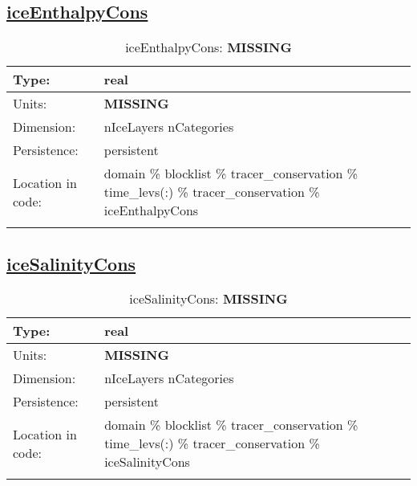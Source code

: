 \subsection[iceEnthalpyCons]{\hyperref[sec:var_tab_tracer_conservation]{iceEnthalpyCons}}
\label{subsec:var_sec_tracer_conservation_iceEnthalpyCons}
\begin{center}
\begin{longtable}{| p{2.0in} | p{4.0in} |}
        \hline 
        Type: & real \\
        \hline 
        Units: & {\bf \color{red} MISSING} \\
        \hline 
        Dimension: & nIceLayers nCategories \\
        \hline 
        Persistence: & persistent \\
        \hline 
         Location in code: & domain \% blocklist \% tracer\_conservation \% time\_levs(:) \% tracer\_conservation \% iceEnthalpyCons \\
         \hline 
    \caption{iceEnthalpyCons: {\bf \color{red} MISSING}}
\end{longtable}
\end{center}
\subsection[iceSalinityCons]{\hyperref[sec:var_tab_tracer_conservation]{iceSalinityCons}}
\label{subsec:var_sec_tracer_conservation_iceSalinityCons}
\begin{center}
\begin{longtable}{| p{2.0in} | p{4.0in} |}
        \hline 
        Type: & real \\
        \hline 
        Units: & {\bf \color{red} MISSING} \\
        \hline 
        Dimension: & nIceLayers nCategories \\
        \hline 
        Persistence: & persistent \\
        \hline 
         Location in code: & domain \% blocklist \% tracer\_conservation \% time\_levs(:) \% tracer\_conservation \% iceSalinityCons \\
         \hline 
    \caption{iceSalinityCons: {\bf \color{red} MISSING}}
\end{longtable}
\end{center}
